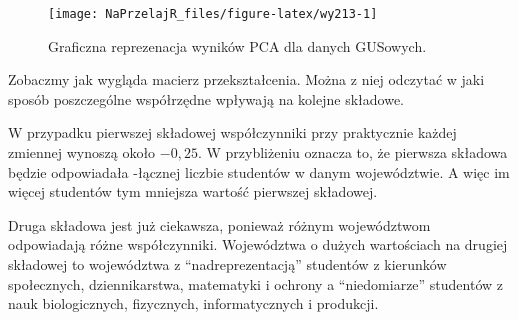\documentclass[polish,]{book}
\newenvironment{Shaded}{\begin{snugshade}}{\end{snugshade}}
\newcommand{\CommentTok}[1]{\textcolor[rgb]{0.56,0.35,0.01}{\textit{#1}}}
\newcommand{\DecValTok}[1]{\textcolor[rgb]{0.00,0.00,0.81}{#1}}
\newcommand{\NormalTok}[1]{#1}
\newcommand{\OperatorTok}[1]{\textcolor[rgb]{0.81,0.36,0.00}{\textbf{#1}}}
\begin{document}
\begin{figure}[h]

{\centering \texttt{[image: NaPrzelajR\_files/figure-latex/wy213-1]} 

}

\caption{Graficzna reprezenacja wyników PCA dla danych GUSowych.}\label{fig:wy213}
\end{figure}

Zobaczmy jak wygląda macierz przekształcenia. Można z niej odczytać w jaki
sposób poszczególne współrzędne wpływają na kolejne składowe.

W przypadku pierwszej składowej współczynniki przy praktycznie każdej zmiennej wynoszą około \(-0,25\). W przybliżeniu oznacza to, że pierwsza składowa będzie
odpowiadała -łącznej liczbie studentów w danym województwie. A więc im więcej
studentów tym mniejsza wartość pierwszej składowej.

Druga składowa jest już ciekawsza, ponieważ różnym województwom odpowiadają różne współczynniki. Województwa o dużych wartościach na drugiej składowej
to województwa z ``nadreprezentacją'' studentów z kierunków społecznych, dziennikarstwa, matematyki i ochrony a ``niedomiarze'' studentów z nauk biologicznych, fizycznych, informatycznych i produkcji.

\begin{Shaded}
\end{Shaded}
\end{document}
